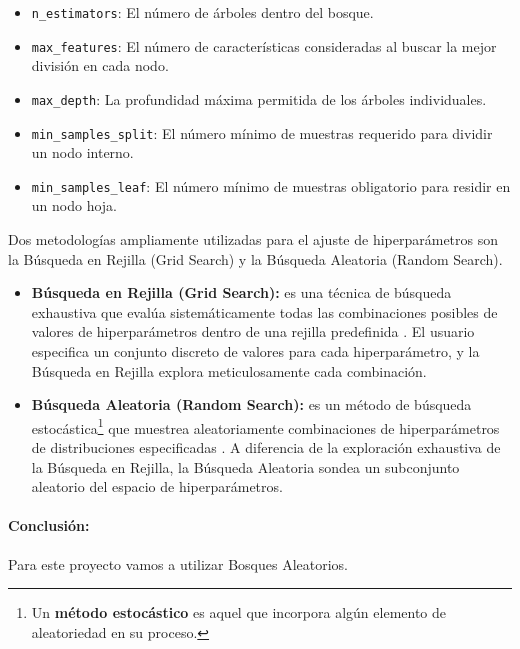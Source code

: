 \begin{itemize}
    \item \texttt{n\_estimators}: El número de árboles dentro del bosque.
    \item \texttt{max\_features}: El número de características consideradas al buscar la mejor división en cada nodo.
    \item \texttt{max\_depth}: La profundidad máxima permitida de los árboles individuales.
    \item \texttt{min\_samples\_split}: El número mínimo de muestras requerido para dividir un nodo interno.
    \item \texttt{min\_samples\_leaf}: El número mínimo de muestras obligatorio para residir en un nodo hoja.
\end{itemize}

Dos metodologías ampliamente utilizadas para el ajuste de hiperparámetros son la Búsqueda en Rejilla (Grid Search) y la Búsqueda Aleatoria (Random Search).

\begin{itemize}
	\item \textbf{Búsqueda en Rejilla (Grid Search):} es una técnica de búsqueda exhaustiva que evalúa sistemáticamente todas las combinaciones posibles de valores de hiperparámetros dentro de una rejilla predefinida \cite{bergstra2012random}.
	El usuario especifica un conjunto discreto de valores para cada hiperparámetro, y la Búsqueda en Rejilla explora meticulosamente cada combinación.

	\item \textbf{Búsqueda Aleatoria (Random Search):} es un método de búsqueda estocástica\footnote{Un \textbf{método estocástico} es aquel que incorpora algún elemento de aleatoriedad en su proceso.} que muestrea aleatoriamente combinaciones de hiperparámetros de distribuciones especificadas \cite{bergstra2012random}.
	A diferencia de la exploración exhaustiva de la Búsqueda en Rejilla, la Búsqueda Aleatoria sondea un subconjunto aleatorio del espacio de hiperparámetros.
\end{itemize}

\paragraph{Conclusión:}
Para este proyecto vamos a utilizar Bosques Aleatorios.

